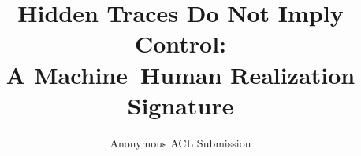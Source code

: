 \documentclass[11pt]{article}
\title{Hidden Traces Do Not Imply Control:\\A Machine--Human Realization Signature}
\author{Anonymous ACL Submission}
\begin{document}
\maketitle



\clearpage
\begingroup
\sloppy
\raggedbottom

\endgroup

\clearpage
\appendix


\FloatBarrier
\end{document}
